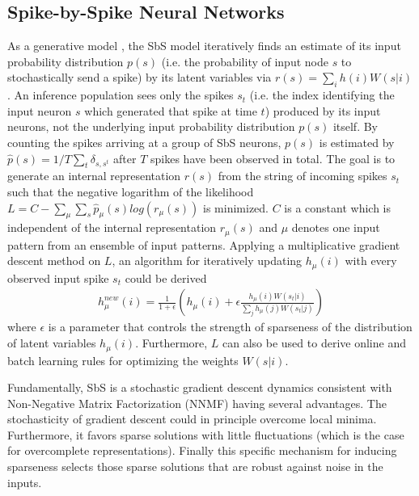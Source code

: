 \subsection{Spike-by-Spike Neural Networks}\label{sec:sbs}
  
  As a generative model \cite{ernst2007efficient}, the SbS model iteratively finds an estimate of its input probability distribution $p(s)$ (i.e. the probability of input node $s$ to stochastically send a spike) by its latent variables via $r(s) = \sum_i h(i) W(s|i)$. An inference population sees only the spikes $s_t$ (i.e. the index identifying the input neuron $s$ which generated that spike at time $t$) produced by its input neurons, not the underlying input probability distribution $p(s)$ itself. By counting the spikes arriving at a group of SbS neurons, $p(s)$ is estimated by $\hat{p}(s) = 1/T \sum_t \delta_{s,s^t}$ after $T$ spikes have been observed in total. The goal is to generate an internal representation $r(s)$ from the string of incoming spikes $s_t$ such that the negative logarithm of the likelihood $L = C - \sum_\mu \sum_s \hat{p}_\mu(s) log\left( r_\mu(s) \right)$ is minimized. $C$ is a constant which is independent of the internal representation $r_\mu(s)$ and $\mu$ denotes one input pattern from an ensemble of input patterns. Applying a multiplicative gradient descent method on $L$, an algorithm for iteratively updating $h_\mu(i)$ with every observed input spike $s_t$ could be derived
  \begin{eqnarray} \label{eq:sbs_update}
  h_\mu^{new}(i) = \frac{1}{1+\epsilon} \left(h_\mu(i) + \epsilon \frac{h_\mu(i) W(s_t|i) }{\sum_j h_\mu(j) W(s_t|j)} \right) 
  \end{eqnarray}
  where $\epsilon$ is a parameter that controls the strength of sparseness of the distribution of latent variables $h_\mu(i)$. Furthermore, $L$ can also be used to derive online and batch learning rules for optimizing the weights $W(s|i)$. 


Fundamentally, SbS is a stochastic gradient descent dynamics
consistent with Non-Negative Matrix Factorization (NNMF) having several advantages. The stochasticity of gradient descent could
in principle overcome local minima.  Furthermore, it favors sparse
solutions with little fluctuations (which is the case for overcomplete
representations). Finally this specific mechanism for inducing
sparseness selects those sparse solutions that are robust against
noise in the inputs.


